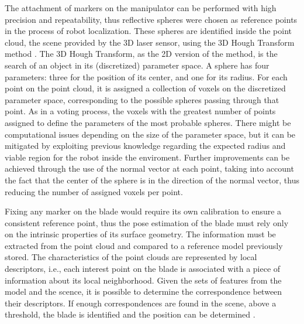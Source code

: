 The attachment of markers on the manipulator can be performed with high
precision and repeatability, thus reflective spheres were chosen as reference
points in the process of robot localization. These spheres are identified inside
the point cloud, the scene provided by the 3D laser sensor, using the 3D Hough
Transform method \cite{camurri20143d}. The 3D Hough Transform, as the 2D version
of the method, is the search of an object in its (discretized) parameter space.
A sphere has four parameters: three for the position of its center, and one for its radius.
For each point on the point cloud, it is assigned a collection of voxels on the
discretized parameter space, corresponding to the possible spheres passing
through that point. As in a voting process, the voxels with the greatest number
of points assigned to define the parameters of the most probable spheres. There
might be computational issues depending on the size of the parameter space, but
it can be mitigated by exploiting previous knowledge regarding the expected
radius and viable region for the robot inside the enviroment. Further
improvements can be achieved through the use of the normal vector at each point,
taking into account the fact that the center of the sphere is in the direction of
the normal vector, thus reducing the number of assigned voxels per point.

Fixing any marker on the blade would require its own calibration to ensure a
consistent reference point, thus the pose estimation of the blade must rely only
on the intrinsic properties of its surface geometry. The information must be
extracted from the point cloud and compared to a reference model previously
stored. The characteristics of the point clouds are represented by local
descriptors, i.e., each interest point on the blade is associated with a piece
of information about its local neighborhood. Given the sets of features from the
model and the scence,  it is possible to determine the correspondence between
their descriptors. If enough correspondences are found in the scene, above a
threshold, the blade is identified and the position can be determined
\cite{Tombari2010a}.


